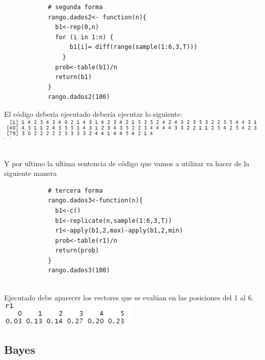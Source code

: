\documentclass[12pt,hidelinks]{article}
\begin{document}
        \begin{lstlisting}
            # segunda forma 
            rango.dados2<- function(n){
              b1<-rep(0,n)
              for (i in 1:n) {
                  b1[i]= diff(range(sample(1:6,3,T)))
                }
              prob<-table(b1)/n
              return(b1)
            }
            rango.dados2(100)
        \end{lstlisting}
        El código debería ejecutado debería ejecutar lo siguiente:\\
        
            \centering
            \includegraphics[scale=1]{probabilidad_condicionada1.JPG}
            \centering
            \caption{}
        \\
        Y por ultimo la ultima sentencia de código que vamos a utilizar va hacer de la siguiente manera \\
        \begin{lstlisting}
            # tercera forma
            rango.dados3<-function(n){
              b1<-c()
              b1<-replicate(n,sample(1:6,3,T))
              r1<-apply(b1,2,max)-apply(b1,2,min)
              prob<-table(r1)/n
              return(prob)
            }
            rango.dados3(100)
        \end{lstlisting}\\
        Ejecutado debe aparecer los vectores que se evalúan en las posiciones del 1 al 6.\\
        
        
            \centering
            \includegraphics[scale=1]{probabilidad_condicionada2.JPG}\\
            \centering
            \caption{}
            
            
	\subsection{Bayes}
\end{document}
